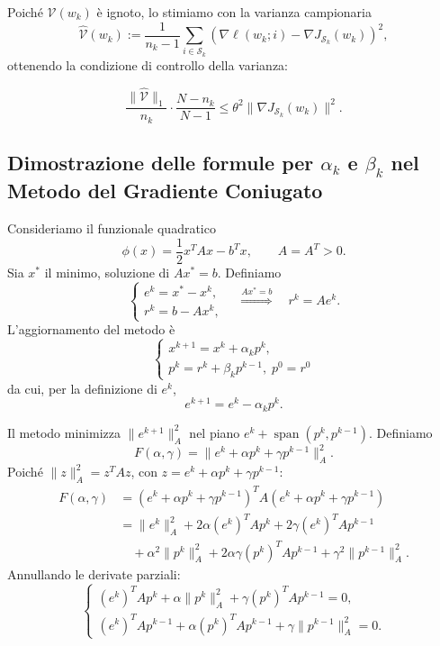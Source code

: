 \documentclass[a4paper,12pt]{article}
\numberwithin{equation}{section}
\numberwithin{figure}{section}
\numberwithin{table}{section}
\begin{document}
Poiché $\mathcal{V}(w_k)$ è ignoto, lo stimiamo con la varianza campionaria
\[
\widehat{\mathcal{V}}(w_k) := \frac{1}{n_k-1}\sum_{i\in\mathcal{S}_k}
\left(\nabla \ell(w_k;i) - \nabla J_{\mathcal{S}_k}(w_k)\right)^2,
\]
ottenendo la condizione di controllo della varianza:

\[
\frac{\|\widehat{\mathcal{V}}\|_1}{n_k} \cdot \frac{N-n_k}{N-1} \le \theta^2 \|\nabla J_{\mathcal{S}_k}(w_k)\|^2.
\]
\newpage

\subsection{Dimostrazione delle formule per $\alpha_k$ e $\beta_k$ nel Metodo del Gradiente Coniugato}
\label{app:cg}

Consideriamo il funzionale quadratico
\[
\phi(x)=\frac12 x^T A x - b^T x, \qquad A=A^T>0. \tag{A.13}
\]
Sia \(x^*\) il minimo, soluzione di \(Ax^*=b\). Definiamo
\[
\begin{cases}
e^k = x^* - x^k, \\
r^k = b - A x^k,
\end{cases}
\quad\overset{Ax^*=b}{\Longrightarrow}\quad
r^k = A e^k. \tag{A.14}
\]
L'aggiornamento del metodo è
\[
\begin{cases}
x^{k+1}=x^k+\alpha_k p^k, \\
p^k=r^k+\beta_k p^{k-1},\; p^0=r^0
\end{cases}
\tag{A.15}
\]
da cui, per la definizione di $e^k$,
\[
e^{k+1}=e^k-\alpha_k p^k. \tag{A.16}
\]

Il metodo minimizza \(\|e^{k+1}\|_A^2\) nel piano \(e^k+\operatorname{span}(p^k,p^{k-1})\).  
Definiamo
\[
F(\alpha,\gamma)=\|e^k+\alpha p^k+\gamma p^{k-1}\|_A^2. \tag{A.17}
\]
Poiché \(\|z\|_A^2 = z^T A z\), con \(z=e^k+\alpha p^k+\gamma p^{k-1}\):
\[
\begin{aligned}
F(\alpha,\gamma)
&= (e^k+\alpha p^k+\gamma p^{k-1})^T A (e^k+\alpha p^k+\gamma p^{k-1}) \\
&= \|e^k\|_A^2+2\alpha(e^k)^T A p^k+2\gamma(e^k)^T A p^{k-1}\\
&\quad+\alpha^2\|p^k\|_A^2+2\alpha\gamma(p^k)^T A p^{k-1}+\gamma^2\|p^{k-1}\|_A^2.
\end{aligned} \tag{A.18}
\]
Annullando le derivate parziali:
\[
\begin{cases}
(e^k)^T A p^k+\alpha\|p^k\|_A^2+\gamma(p^k)^T A p^{k-1}=0,\\[2pt]
(e^k)^T A p^{k-1}+\alpha(p^k)^T A p^{k-1}+\gamma\|p^{k-1}\|_A^2=0.
\end{cases} \tag{A.19}
\]
\end{document}

